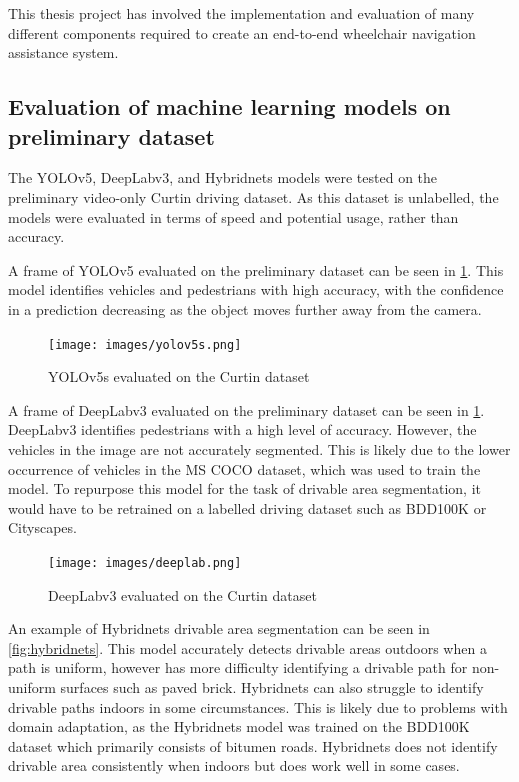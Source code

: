 This thesis project has involved the implementation and evaluation
of many different components required to create an end-to-end wheelchair
navigation assistance system.

\subsection{Evaluation of machine learning models on preliminary dataset}
The YOLOv5, DeepLabv3, and Hybridnets models were tested on the preliminary
video-only Curtin driving dataset. As this dataset is unlabelled, the
models were evaluated in terms of speed and potential usage, rather than accuracy.

A frame of YOLOv5 evaluated on the preliminary dataset can be seen in \cref{fig:yolov5s}.
This model identifies vehicles and pedestrians with high accuracy, with the confidence in
a prediction decreasing as the object moves further away from the camera.

\begin{figure}[H]
    \centering
    \texttt{[image: images/yolov5s.png]}
    \caption{YOLOv5s evaluated on the Curtin dataset}
    \label{fig:yolov5s}
\end{figure}

A frame of DeepLabv3 evaluated on the preliminary dataset can be seen in \cref{fig:yolov5s}.
DeepLabv3 identifies pedestrians with a high level of accuracy. However, the vehicles in the
image are not accurately segmented. This is likely due to the lower occurrence of vehicles
in the MS COCO dataset, which was used to train the model.
To repurpose this model for the task of drivable area segmentation,
it would have to be retrained on a labelled driving dataset such as BDD100K or Cityscapes.

\begin{figure}[H]
    \centering
    \texttt{[image: images/deeplab.png]}
    \caption{DeepLabv3 evaluated on the Curtin dataset}
    \label{fig:deeplab}
\end{figure}

An example of Hybridnets drivable area segmentation can be seen in \cref{fig:hybridnets}.
This model accurately detects drivable areas outdoors when a path is uniform, however
has more difficulty identifying a drivable path for non-uniform surfaces such as paved brick.
Hybridnets can also struggle to identify drivable paths indoors in some circumstances.
This is likely due to problems with domain adaptation, as the Hybridnets model was trained on the
BDD100K dataset which primarily consists of bitumen roads.
Hybridnets does not identify drivable area consistently when indoors
but does work well in some cases.

